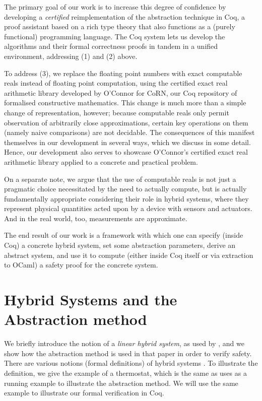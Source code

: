 \documentclass[runningheads]{llncs}
\begin{document}
The primary goal of our work is to increase this degree of confidence by developing a \emph{certified} reimplementation of the abstraction technique in Coq, a proof assistant based on a rich type theory that also functions as a (purely functional) programming language. The Coq system lets us develop the algorithms and their formal correctness proofs in tandem in a unified environment, addressing (1) and (2) above.

To address (3), we replace the floating point numbers with exact computable reals instead of floating point computation, using the certified exact real arithmetic library developed by O'Connor \cite{oconnor} for CoRN, our Coq repository of formalised constructive mathematics. \cite{corn} This change is much more than a simple change of representation, however; because computable reals only permit observation of arbitrarily close approximations, certain key operations on them (namely naive comparisons) are not decidable. The consequences of this manifest themselves in our development in several ways, which we discuss in some detail. Hence, our development also serves to showcase O'Connor's certified exact real arithmetic library applied to a concrete and practical problem.

On a separate note, we argue that the use of computable reals is not just a pragmatic choice necessitated by the need to actually compute, but is actually fundamentally appropriate considering their role in hybrid systems, where they represent physical quantities acted upon by a device with sensors and actuators. And in the real world, too, measurements are approximate.

The end result of our work is a framework with which one can specify (inside Coq) a concrete hybrid system, set some abstraction parameters, derive an abstract system, and use it to compute (either inside Coq itself or via extraction to OCaml) a safety proof for the concrete system.

\section{Hybrid Systems and the Abstraction method}
\label{sec:hybsys}
We briefly introduce the notion of a {\em linear hybrid system}, as
used by \cite{alur}, and we show how the abstraction method is used in
that paper in order to verify safety. There are various notions
(formal definitions) of hybrid systems
\cite{henziger,lynchvaandrager}. To illustrate the definition, we give
the example of a thermostat, which is the same as \cite{alur} uses as
a running example to illustrate the abstraction method. We will use
the same example to illustrate our formal verification in Coq.
\end{document}
